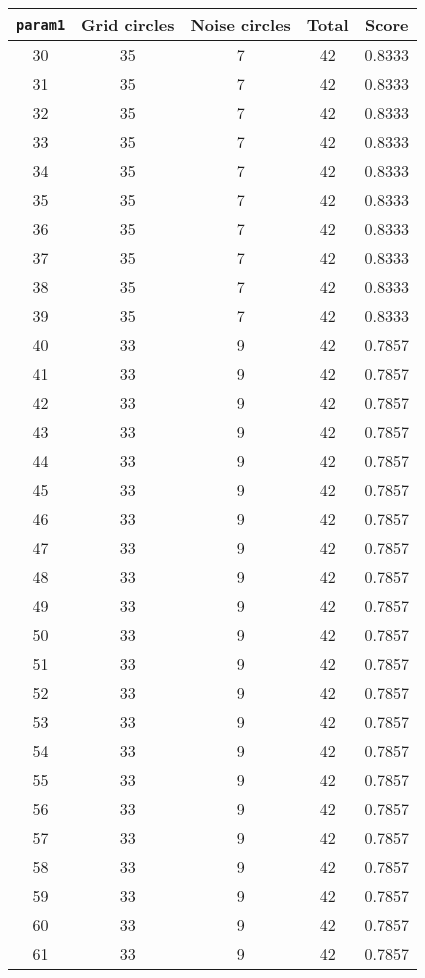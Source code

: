 \documentclass[letterpaper, 12pt]{article}
\begin{document}
\begin{longtable}{|c|c|c|c|c|}
\hline
\textbf{\texttt{param1}} & \textbf{Grid circles} & \textbf{Noise circles} & \textbf{Total} & \textbf{Score} \\
\hline
30 & 35 & 7 & 42 & 0.8333 \\
\hline
31 & 35 & 7 & 42 & 0.8333 \\
\hline
32 & 35 & 7 & 42 & 0.8333 \\
\hline
33 & 35 & 7 & 42 & 0.8333 \\
\hline
34 & 35 & 7 & 42 & 0.8333 \\
\hline
35 & 35 & 7 & 42 & 0.8333 \\
\hline
36 & 35 & 7 & 42 & 0.8333 \\
\hline
37 & 35 & 7 & 42 & 0.8333 \\
\hline
38 & 35 & 7 & 42 & 0.8333 \\
\hline
39 & 35 & 7 & 42 & 0.8333 \\
\hline
40 & 33 & 9 & 42 & 0.7857 \\
\hline
41 & 33 & 9 & 42 & 0.7857 \\
\hline
42 & 33 & 9 & 42 & 0.7857 \\
\hline
43 & 33 & 9 & 42 & 0.7857 \\
\hline
44 & 33 & 9 & 42 & 0.7857 \\
\hline
45 & 33 & 9 & 42 & 0.7857 \\
\hline
46 & 33 & 9 & 42 & 0.7857 \\
\hline
47 & 33 & 9 & 42 & 0.7857 \\
\hline
48 & 33 & 9 & 42 & 0.7857 \\
\hline
49 & 33 & 9 & 42 & 0.7857 \\
\hline
50 & 33 & 9 & 42 & 0.7857 \\
\hline
51 & 33 & 9 & 42 & 0.7857 \\
\hline
52 & 33 & 9 & 42 & 0.7857 \\
\hline
53 & 33 & 9 & 42 & 0.7857 \\
\hline
54 & 33 & 9 & 42 & 0.7857 \\
\hline
55 & 33 & 9 & 42 & 0.7857 \\
\hline
56 & 33 & 9 & 42 & 0.7857 \\
\hline
57 & 33 & 9 & 42 & 0.7857 \\
\hline
58 & 33 & 9 & 42 & 0.7857 \\
\hline
59 & 33 & 9 & 42 & 0.7857 \\
\hline
60 & 33 & 9 & 42 & 0.7857 \\
\hline
61 & 33 & 9 & 42 & 0.7857 \\

\end{longtable}
\end{document}
